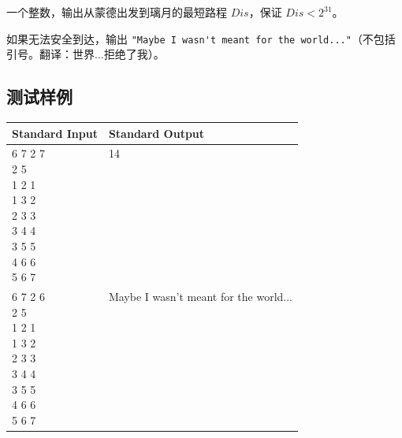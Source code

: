 一个整数，输出从蒙德出发到璃月的最短路程 $Dis$，保证 $Dis < 2^{31}$。

如果无法安全到达，输出 \lstinline|"Maybe I wasn't meant for the world..."|（不包括引号。翻译：世界...拒绝了我）。

\subsection*{测试样例}

\begin{table}[H]
\begin{tabularx}{\textwidth}{|X|X|}
    \hline
    \textbf{Standard Input} & \textbf{Standard Output} \\ 
    \hline
    \tablecell{
        6 7 2 7 \\
        2 5 \\
        1 2 1 \\
        1 3 2 \\
        2 3 3 \\
        3 4 4 \\
        3 5 5 \\ 
        4 6 6 \\
        5 6 7 \\
    } & \tablecell{
        14 \\ \\ \\ \\ \\ \\ \\ \\ \\
    } \\ 
    \hline
    \tablecell{
        6 7 2 6 \\
        2 5 \\
        1 2 1 \\
        1 3 2 \\
        2 3 3 \\
        3 4 4 \\
        3 5 5 \\
        4 6 6 \\
        5 6 7 \\     
    } & \tablecell{
        Maybe I wasn't meant for the world... 
        \\ \\ \\ \\ \\ \\ \\ \\ \\
    } \\
    \hline
\end{tabularx}
\end{table}

